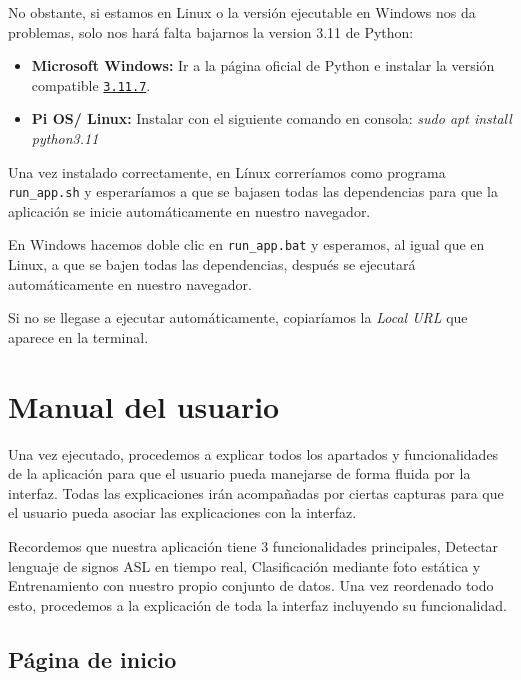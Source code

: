 No obstante, si estamos en Linux o la versión ejecutable en Windows nos da problemas, solo nos hará falta bajarnos la version 3.11 de Python:

\begin{itemize}
    \item \textbf{Microsoft Windows:} Ir a la página oficial de Python e instalar la versión compatible \href{https://www.python.org/downloads/release/python-3117/}{\texttt{3.11.7}}.

    \item \textbf{Pi OS/ Linux:} Instalar con el siguiente comando en consola:
    \textit{sudo apt install python3.11}
\end{itemize}

Una vez instalado correctamente, en Línux correríamos como programa \texttt{run\_app.sh} y esperaríamos a que se bajasen todas las dependencias para que la aplicación se inicie automáticamente en nuestro navegador.

En Windows hacemos doble clic en \texttt{run\_app.bat} y esperamos, al igual que en Linux, a que se bajen todas las dependencias, después se ejecutará automáticamente en nuestro navegador.

Si no se llegase a ejecutar automáticamente, copiaríamos la \textit{Local URL} que aparece en la terminal.


\section{Manual del usuario}

Una vez ejecutado, procedemos a explicar todos los apartados y funcionalidades de la aplicación para que el usuario pueda manejarse de forma fluida por la interfaz. Todas las explicaciones irán acompañadas por ciertas capturas para que el usuario pueda asociar las explicaciones con la interfaz.


Recordemos que nuestra aplicación tiene 3 funcionalidades principales, Detectar lenguaje de signos ASL en tiempo real, Clasificación mediante foto estática y Entrenamiento con nuestro propio conjunto de datos. Una vez reordenado todo esto, procedemos a la explicación de toda la interfaz incluyendo su funcionalidad.

\subsection{Página de inicio}

